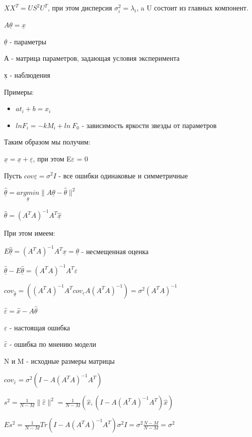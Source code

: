 \documentclass[a4paper, 12pt]{article}
\renewcommand{\epsilon}{\varepsilon}
\begin{document}
	$XX^T = US^2U^T$, при этом дисперсия $\sigma_i^2 = \lambda_i$, a U состоит из главных компонент.
	
	
	$A\underline{\theta} = \underline{x}$
	
	$\underline{\theta}$ - параметры
	
	А - матрица параметров, задающая условия эксперимента
	
	$\underline{х}$ - наблюдения
	
	Примеры: 
	
	\begin{itemize}
		\item $at_i + b = x_i$ 
		\item $ln F_i = -k M_i + ln\: F_0$ - зависимость яркости звезды от параметров
	\end{itemize}
	
	Таким образом мы получим:
	
	$\underline{\hat{x}} = \underline{x} + \underline{\epsilon} $, при этом E\underline{$\epsilon$} = 0
	
	Пусть $cov \underline{\epsilon} = \sigma^2 I$ - все ошибки одинаковые и симметричные 
	
	$\underline{\hat{\theta}} = \underset{\underline{\theta}}{argmin} \|A\underline{\theta} - \hat{\theta}\|^2$
	
	$\hat{\theta} = (A^TA)^{-1} A^T\hat{\underline{x}}$
	
	При этом имеем:
	
	$E\hat{\underline{\theta}} = (A^TA)^{-1} A^T{\underline{x}} = \underline{\theta} $ - несмещенная оценка
	
	$\hat{\underline{\theta}} - E\hat{\underline{\theta}} = (A^TA)^{-1} A^T\epsilon$
	
	$cov_{\hat{\underline{\theta}}} = ((A^TA)^{-1} A^T cov_{\underline{\epsilon}} A(A^TA)^{-1}) = \sigma^2 (A^TA)^{-1}$
	
	$\hat{\epsilon} = \hat{x} - A \hat{\theta}$
	
	$\epsilon$ - настоящая ошибка
	
	$\hat{\epsilon}$ - ошибка по мнению модели
	
	N и M - исходные размеры матрицы
	
	$cov_{\hat{\epsilon}} = \sigma^2(I - A(A^TA)^{-1}A^T)$
	
	$s^2 = \frac{1}{N-M}\|\hat{\epsilon}\|^2 =\frac{1}{N-M}(\hat{x}, (I - A(A^TA)^{-1}A^T)\hat{x})$
	
	$Es^2 = \frac{1}{N-M}Tr(I - A(A^TA)^{-1}A^T)\sigma^2 I = \sigma^2\frac{N-M}{N-M} = \sigma^2$
	
\end{document}

